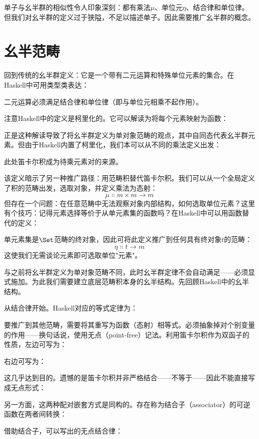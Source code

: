 单子与幺半群的相似性令人印象深刻：都有乘法$\mu$、单位元$\eta$、结合律和单位律。但我们对幺半群的定义过于狭隘，不足以描述单子。因此需要推广幺半群的概念。

\section{幺半范畴}

回到传统的幺半群定义：它是一个带有二元运算和特殊单位元素的集合。在Haskell中可用类型类表达：

二元运算必须满足结合律和单位律（即与单位元相乘不起作用）。

注意Haskell中的定义是柯里化的。它可以解读为将每个元素映射为函数：

正是这种解读导致了将幺半群定义为单对象范畴的观点，其中自同态代表幺半群元素。但由于Haskell内置了柯里化，我们本可以从不同的乘法定义出发：

此处笛卡尔积成为待乘元素对的来源。

该定义暗示了另一种推广路径：用范畴积替代笛卡尔积。我们可以从一个全局定义了积的范畴出发，选取对象，并定义乘法为态射：
$$\mu \Colon m\times{}m \to m$$
但存在一个问题：在任意范畴中无法观察对象内部结构，如何选取单位元素？这里有个技巧：记得元素选择等价于从单元素集的函数吗？在Haskell中可以用函数替代的定义：

单元素集是$\Set$范畴的终对象，因此可将此定义推广到任何具有终对象$t$的范畴：
$$\eta \Colon t \to m$$
这使我们无需谈论元素即可选取单位"元素"。

与之前将幺半群定义为单对象范畴不同，此时幺半群定律不会自动满足——必须显式施加。为此我们需要建立底层范畴积本身的幺半结构。先回顾Haskell中的幺半结构。

从结合律开始。Haskell对应的等式定律为：

要推广到其他范畴，需要将其重写为函数（态射）相等式。必须抽象掉对个别变量的作用——换句话说，使用无点（point-free）记法。利用笛卡尔积作为双函子的性质，左边可写为：

右边可写为：

这几乎达到目的。遗憾的是笛卡尔积并非严格结合——不等于——因此不能直接写成无点形式：

另一方面，这两种配对嵌套方式是同构的。存在称为结合子（associator）的可逆函数在两者间转换：

借助结合子，可以写出的无点结合律：


